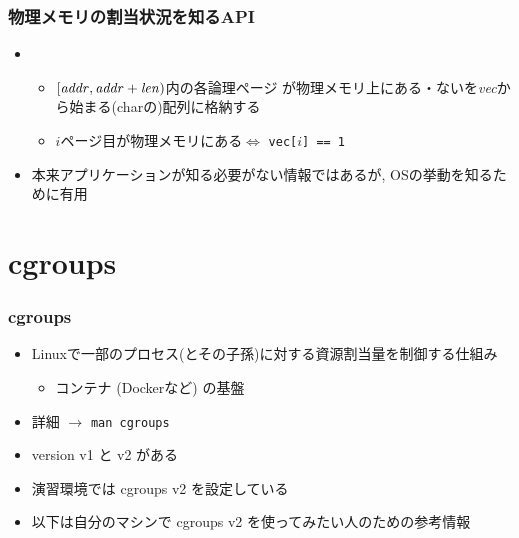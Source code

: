 \documentclass[12pt,dvipdfmx]{beamer}
\begin{document}
\begin{frame}
  \frametitle{物理メモリの割当状況を知るAPI}
  \begin{itemize}
  \item {}
    \begin{itemize}
    \item $[{\it addr}, {\it addr+len})$内の各論理ページ
      が物理メモリ上にある・ないを{\it vec}から始まる(charの)配列に格納する
    \item $i$ページ目が物理メモリにある$\iff$ {\tt vec[$i$] == 1}
    \end{itemize}
  \item 本来アプリケーションが知る必要がない情報ではあるが,
    OSの挙動を知るために有用
  \end{itemize}
\end{frame}

\section{cgroups}

\begin{frame}
  \frametitle{cgroups}
  \begin{itemize}
  \item Linuxで一部のプロセス(とその子孫)に対する資源割当量を制御する仕組み
    \begin{itemize}
    \item コンテナ (Dockerなど) の基盤
    \end{itemize}
  \item 詳細 $\rightarrow$ {\tt man cgroups}
  \item version v1 と v2 がある
  \item 演習環境では cgroups v2 を設定している
  \item 以下は自分のマシンで cgroups v2 を使ってみたい人のための参考情報
  \end{itemize}
\end{frame}
\end{document}
